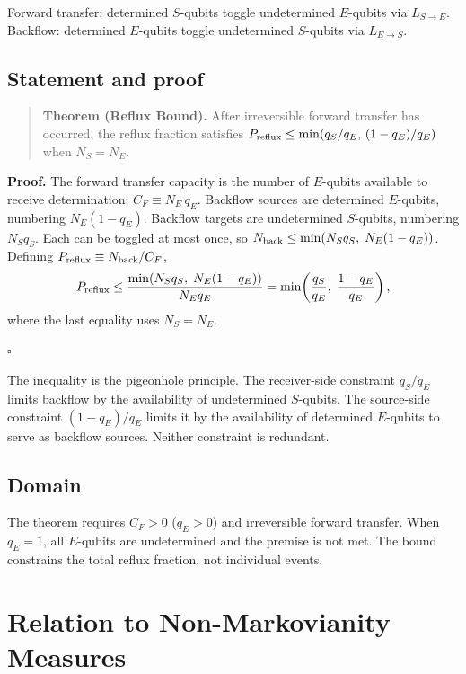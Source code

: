 \documentclass[aps,prl,twocolumn,superscriptaddress,hyperref]{revtex4-2}
\begin{document}
Forward transfer: determined $S$-qubits toggle undetermined $E$-qubits via $L_{S\to E}$. Backflow: determined $E$-qubits toggle undetermined $S$-qubits via $L_{E\to S}$.

\subsection{Statement and proof}

\begin{quote}
\textbf{Theorem (Reflux Bound).} After irreversible forward transfer has occurred, the reflux fraction satisfies $P_{\rm reflux} \leq \min(q_S/q_E,\,(1-q_E)/q_E)$ when $N_S = N_E$.
\end{quote}

\textbf{Proof.}
The forward transfer capacity is the number of $E$-qubits available to receive determination: $C_F \equiv N_E \, q_E$. Backflow sources are determined $E$-qubits, numbering $N_E(1-q_E)$. Backflow targets are undetermined $S$-qubits, numbering $N_S q_S$. Each can be toggled at most once, so $N_{\rm back} \leq \min(N_S q_S,\; N_E(1-q_E))$. Defining $P_{\rm reflux} \equiv N_{\rm back} / C_F$,
\begin{equation}
P_{\rm reflux} \leq \frac{\min(N_S q_S,\; N_E(1-q_E))}{N_E q_E}
= \min\!\left(\frac{q_S}{q_E},\; \frac{1-q_E}{q_E}\right),
\label{eq:proof}
\end{equation}
where the last equality uses $N_S = N_E$.

$\square$

The inequality is the pigeonhole principle. The receiver-side constraint $q_S/q_E$ limits backflow by the availability of undetermined $S$-qubits. The source-side constraint $(1-q_E)/q_E$ limits it by the availability of determined $E$-qubits to serve as backflow sources. Neither constraint is redundant.

\subsection{Domain}

The theorem requires $C_F > 0$ ($q_E > 0$) and irreversible forward transfer. When $q_E = 1$, all $E$-qubits are undetermined and the premise is not met. The bound constrains the total reflux fraction, not individual events.

\section{Relation to Non-Markovianity Measures}
\end{document}

